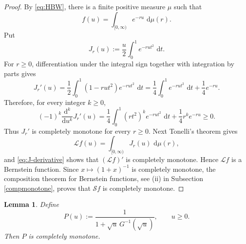 \documentclass[11pt]{article}
\newtheorem{lemma}[theorem]{Lemma}
\theoremstyle{definition}
\theoremstyle{remark}
\newcommand{\dd}{\,\mathrm d}
\begin{document}
\begin{proof}
By \eqref{eq:HBW}, there is a finite positive measure $\mu$ such that
\[
 f(u)=\int_{[0,\infty)}e^{-ru}\,\dd\mu(r).
\]
Put
\[
 J_r(u):=\frac u2\int_0^1e^{-rut^2}\,\dd t.
\]
For $r\geq0$, differentiation under the integral sign together with integration by parts gives
\begin{equation}\label{eq:J-derivative}
 J_r'(u)
 =\frac12\int_0^1(1-rut^2)e^{-rut^2}\,\dd t
 =\frac14\int_0^1e^{-rut^2}\,\dd t+\frac14e^{-ru}.
\end{equation}
Therefore, for every integer $k\geq0$,
\[
 (-1)^k\frac{\mathrm d^k}{\mathrm d u^k}J_r'(u)
 =\frac14\int_0^1(rt^2)^k e^{-rut^2}\,\dd t
  +\frac14r^k e^{-ru}
 \geq0.
\]
Thus $J_r'$ is completely monotone for every $r\geq0$. Next Tonelli's theorem gives
\[
 \mathcal Lf(u)=\int_{[0,\infty)}J_r(u)\,\dd\mu(r),
\]
and \eqref{eq:J-derivative} shows that $(\mathcal Lf)'$ is completely
monotone.  Hence $\mathcal Lf$ is a Bernstein function.  Since
$x\mapsto(1+x)^{-1}$ is completely monotone, the composition theorem
for Bernstein functions, see  (ii) in Subsection \ref{compmonotone},  proves that $\mathcal Sf$ is completely
monotone. %
\end{proof}

\begin{lemma}\label{lem:P-completely-monotone}
Define
\begin{equation}\label{eq:P-definition}
 P(u):=\frac1{1+\sqrt u\,G^{-1}(\sqrt u)},
 \qquad u\geq0.
\end{equation}
Then $P$ is completely monotone.
\end{lemma}
\end{document}
